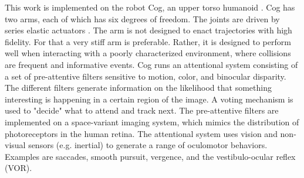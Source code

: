 This work is implemented on the robot Cog, an upper torso humanoid
\cite{brooks99cog}.  
Cog has two arms, each of which has six
degrees of freedom. %
The joints are driven by series elastic
actuators \cite{williamson99robot}.
The arm is not designed to enact trajectories with
high fidelity.  For that a very stiff arm is preferable.  Rather, it
is designed to perform well when interacting with a poorly
characterized environment, where collisions are frequent and
informative events.
Cog runs an attentional system consisting of a set of pre-attentive
filters sensitive to motion, color, and binocular disparity. The
different filters generate information on the likelihood that
something interesting is happening in a certain region of the image. A
voting mechanism is used to "decide" what to attend and track
next. The pre-attentive filters are implemented on a space-variant
imaging system, which mimics the distribution
of photoreceptors in the human retina.
 The attentional system uses vision and non-visual sensors
(e.g. inertial) to generate a range of oculomotor behaviors. Examples
are saccades, smooth pursuit, vergence, and the vestibulo-ocular
reflex (VOR).






